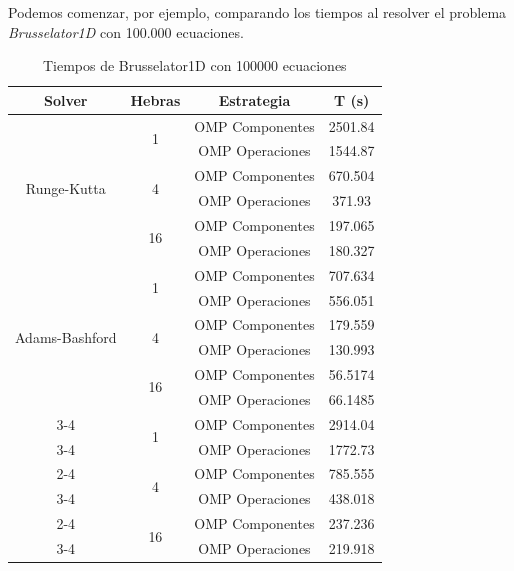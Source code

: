 Podemos comenzar, por ejemplo, comparando los tiempos al resolver el problema \textit{Brusselator1D} con 100.000 ecuaciones.
\begin{table}[H]
	\begin{center}
		\begin{tabular}{| c | c | c | c |}
			\hline
			\textbf{Solver} & \textbf{Hebras} & \textbf{Estrategia} & \textbf{T (s)} \\
			\hline
			
			\multirow{6}{*}{Runge-Kutta}
			& \multirow{2}{*}{1}  & OMP Componentes   & 2501.84 \\
			\cline{3-4}
			&                     & OMP Operaciones & 1544.87 \\
			\cline{2-4}
			& \multirow{2}{*}{4}  & OMP Componentes   & 670.504 \\
			\cline{3-4}
			&                     & OMP Operaciones & 371.93 \\
			\cline{2-4}
			& \multirow{2}{*}{16} & OMP Componentes   & 197.065 \\
			\cline{3-4}
			&                     & OMP Operaciones & 180.327 \\
			\hline
			
			\multirow{6}{*}{Adams-Bashford}
			& \multirow{2}{*}{1}  & OMP Componentes   & 707.634 \\
			\cline{3-4}
			&                     & OMP Operaciones & 556.051 \\
			\cline{2-4}
			& \multirow{2}{*}{4}  & OMP Componentes   & 179.559 \\
			\cline{3-4}
			&                     & OMP Operaciones & 130.993 \\
			\cline{2-4}
			& \multirow{2}{*}{16} & OMP Componentes   & 56.5174 \\
			\cline{3-4}
			&                     & OMP Operaciones & 66.1485 \\
			\cline{3-4}
			\hline
			
			\multirow{6}{*}{Adams-Bashford-Moulton}
			& \multirow{2}{*}{1}  & OMP Componentes   & 2914.04 \\
			\cline{3-4}
			&                     & OMP Operaciones & 1772.73 \\
			
			\cline{2-4}
			& \multirow{2}{*}{4}  & OMP Componentes   & 785.555 \\
			\cline{3-4}
			&                     & OMP Operaciones & 438.018 \\
			
			\cline{2-4}
			& \multirow{2}{*}{16} & OMP Componentes   & 237.236 \\
			\cline{3-4}
			&                     & OMP Operaciones & 219.918 \\
			
			\hline
			
		\end{tabular}
		\caption{Tiempos de Brusselator1D con 100000 ecuaciones}
		\label{tab:Brusselator1D-100K}
	\end{center}
\end{table}


